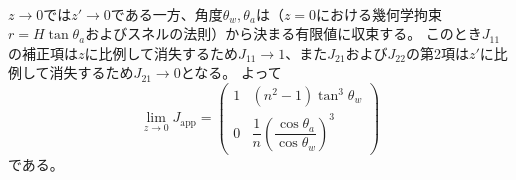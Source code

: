 \paragraph{}
$z\to 0$では$z'\to 0$である一方、角度$\theta_w,\theta_a$は（$z=0$における幾何学拘束$r=H\tan\theta_a$およびスネルの法則）から決まる有限値に収束する。
このとき$J_{11}$の補正項は$z$に比例して消失するため$J_{11}\to 1$、また$J_{21}$および$J_{22}$の第2項は$z'$に比例して消失するため$J_{21}\to 0$となる。
よって
\begin{equation}\label{eq:Jacobian-app-z0}
  \lim_{z\to 0} J_{\mathrm{app}}
  =
  \begin{pmatrix}
    1 & (n^2-1)\tan^3\theta_w \\
    0 & \dfrac{1}{n}\left(\dfrac{\cos\theta_a}{\cos\theta_w}\right)^3
  \end{pmatrix}
\end{equation}
である。

